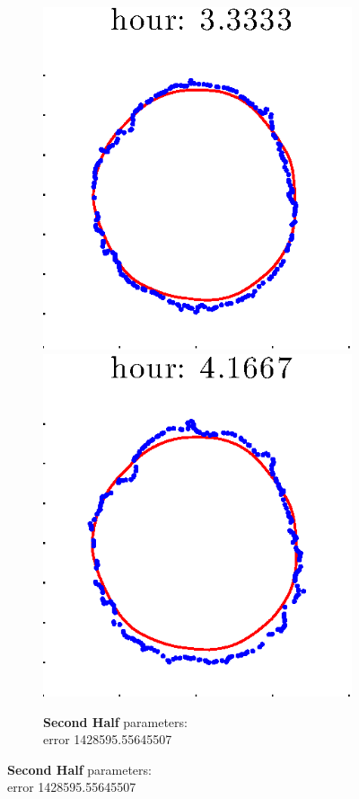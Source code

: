 \documentclass[12pt]{article}
\begin{document}
\begin{figure}[h!]
\begin{subfigure}[b]{.3\textwidth}
		\includegraphics[height=.15\textheight]{Pos0/secondhalf/second5.eps}
		\includegraphics[height=.15\textheight]{Pos0/secondhalf/second6.eps}
		\caption{\textbf{Second Half} parameters: \\error 1428595.55645507}
	\end{subfigure}
\end{figure}
\end{document}
